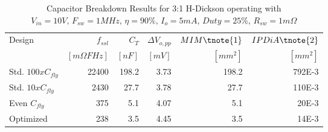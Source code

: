 \begin{table}[!h]
    \renewcommand{\arraystretch}{1.3}
    \begin{threeparttable}
    \centering
    \caption{Capacitor Breakdown Results for 3:1 H-Dickson operating with
             $V_{in} = 10V, \,  F_{sw} = 1MHz, \, \eta=90\%, \, I_o =5mA , \, Duty = 25\% , \, R_{sw}=1m \Omega$  }
    \label{tab:scc_results_II}
    \begin{tabular}{ l | r | r | r || r | r  }
      Design              &  $f_{ssl}$        & $C_T$  & $\Delta V_{o,pp}$  & $ MIM\tnote{1} $  & $IPDiA \tnote{2}$  \\
                          &  $[m\Omega F Hz]$ & $[nF]$ &     $[mV]$       & $[mm^2]$            & $[mm^2]$  \\
                          \hline \hline
      Std. $100 x C_{fly}$  &  22400   &  198.2     &   3.73       & 198.2 &   792E-3    \\ \hline
      Std. $10 x C_{fly}$   &  2430    &   27.7     &   3.78      & 27.7  &   110E-3 \\ \hline
      Even $C_{fly}$        &  375     &    5.1     &   4.07      &  5.1  &   20E-3  \\ \hline
      Optimized             &  238     &    3.5     &   4.45     &  3.5  &   14E-3

    \end{tabular}
    \end{threeparttable}
\end{table}



